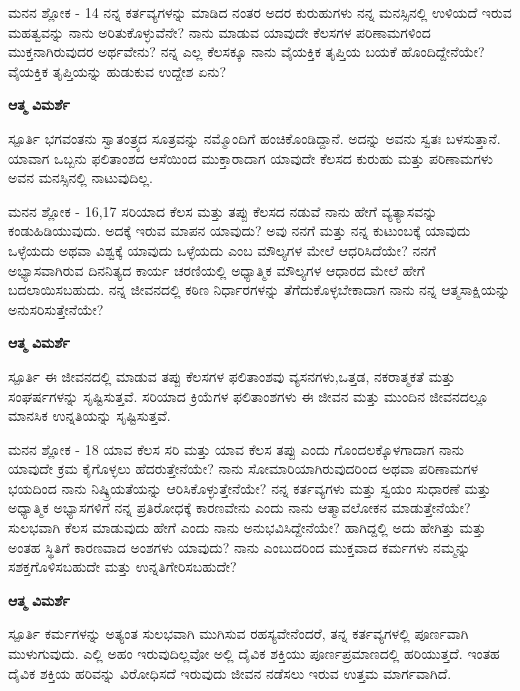 \begin{mananam}{\mananamfont ಮನನ ಶ್ಲೋಕ - \textenglish{14}}
\footnotesize \mananamtext ನನ್ನ ಕರ್ತವ್ಯಗಳನ್ನು ಮಾಡಿದ ನಂತರ ಅದರ ಕುರುಹುಗಳು ನನ್ನ ಮನಸ್ಸಿನಲ್ಲಿ ಉಳಿಯದೆ ಇರುವ ಮಹತ್ವವನ್ನು ನಾನು ಅರಿತುಕೊಳ್ಳುವೆನೇ? ನಾನು ಮಾಡುವ ಯಾವುದೇ ಕೆಲಸಗಳ ಪರಿಣಾಮಗಳಿಂದ ಮುಕ್ತನಾಗಿರುವುದರ ಅರ್ಥವೇನು? ನನ್ನ ಎಲ್ಲ ಕೆಲಸಕ್ಕೂ ನಾನು ವೈಯಕ್ತಿಕ ತೃಪ್ತಿಯ ಬಯಕೆ ಹೊಂದಿದ್ದೇನೆಯೇ? ವೈಯಕ್ತಿಕ ತೃಪ್ತಿಯನ್ನು ಹುಡುಕುವ ಉದ್ದೇಶ ಏನು?
\end{mananam}
\WritingHand\enspace\textbf{ಆತ್ಮ ವಿಮರ್ಶೆ}\\
\begin{inspiration}{\mananamfont ಸ್ಪೂರ್ತಿ}
\footnotesize \mananamtext ಭಗವಂತನು ಸ್ವಾತಂತ್ರ್ಯದ ಸೂತ್ರವನ್ನು ನಮ್ಮೊಂದಿಗೆ ಹಂಚಿಕೊಂಡಿದ್ದಾನೆ. ಅದನ್ನು ಅವನು ಸ್ವತಃ ಬಳಸುತ್ತಾನೆ. ಯಾವಾಗ ಒಬ್ಬನು  ಫಲಿತಾಂಶದ ಆಸೆಯಿಂದ ಮುಕ್ತಾರಾದಾಗ ಯಾವುದೇ ಕೆಲಸದ ಕುರುಹು ಮತ್ತು ಪರಿಣಾಮಗಳು  ಅವನ ಮನಸ್ಸಿನಲ್ಲಿ ನಾಟುವುದಿಲ್ಲ.
\end{inspiration}
\newpage

\begin{mananam}{\mananamfont ಮನನ ಶ್ಲೋಕ - \textenglish{16,17}}
\footnotesize \mananamtext ಸರಿಯಾದ ಕೆಲಸ ಮತ್ತು ತಪ್ಪು ಕೆಲಸದ ನಡುವೆ ನಾನು ಹೇಗೆ ವ್ಯತ್ಯಾಸವನ್ನು ಕಂಡುಹಿಡಿಯುವುದು. ಅದಕ್ಕೆ ಇರುವ ಮಾಪನ ಯಾವುದು? ಅವು ನನಗೆ ಮತ್ತು ನನ್ನ ಕುಟುಂಬಕ್ಕೆ ಯಾವುದು ಒಳ್ಳೆಯದು ಅಥವಾ ವಿಶ್ವಕ್ಕೆ ಯಾವುದು ಒಳ್ಳೆಯದು ಎಂಬ ಮೌಲ್ಯಗಳ ಮೇಲೆ ಆಧರಿಸಿದೆಯೇ? ನನಗೆ ಅಭ್ಯಾಸವಾಗಿರುವ ದಿನನಿತ್ಯದ ಕಾರ್ಯ ಚರಣಿಯಲ್ಲಿ ಅಧ್ಯಾತ್ಮಿಕ ಮೌಲ್ಯಗಳ ಆಧಾರದ ಮೇಲೆ ಹೇಗೆ ಬದಲಾಯಿಸಬಹುದು. ನನ್ನ ಜೀವನದಲ್ಲಿ ಕಠಿಣ ನಿರ್ಧಾರಗಳನ್ನು ತೆಗೆದುಕೊಳ್ಳಬೇಕಾದಾಗ ನಾನು ನನ್ನ ಆತ್ಮಸಾಕ್ಷಿಯನ್ನು ಅನುಸರಿಸುತ್ತೇನೆಯೇ?
\end{mananam}
\WritingHand\enspace\textbf{ಆತ್ಮ ವಿಮರ್ಶೆ}\\
\begin{inspiration}{\mananamfont ಸ್ಪೂರ್ತಿ}
\footnotesize \mananamtext ಈ ಜೀವನದಲ್ಲಿ ಮಾಡುವ ತಪ್ಪು ಕೆಲಸಗಳ ಫಲಿತಾಂಶವು ವ್ಯಸನಗಳು,ಒತ್ತಡ, ನಕರಾತ್ಮಕತೆ ಮತ್ತು ಸಂಘರ್ಷಗಳನ್ನು ಸೃಷ್ಟಿಸುತ್ತವೆ. ಸರಿಯಾದ ಕ್ರಿಯೆಗಳ ಫಲಿತಾಂಶಗಳು ಈ ಜೀವನ ಮತ್ತು ಮುಂದಿನ ಜೀವನದಲ್ಲೂ ಮಾನಸಿಕ ಉನ್ನತಿಯನ್ನು ಸೃಷ್ಟಿಸುತ್ತವೆ.
\end{inspiration}
\newpage

\begin{mananam}{\mananamfont ಮನನ ಶ್ಲೋಕ - \textenglish{18}}
\footnotesize \mananamtext ಯಾವ ಕೆಲಸ ಸರಿ ಮತ್ತು ಯಾವ ಕೆಲಸ ತಪ್ಪು ಎಂದು ಗೊಂದಲಕ್ಕೊಳಗಾದಾಗ ನಾನು ಯಾವುದೇ ಕ್ರಮ ಕೈಗೊಳ್ಳಲು ಹೆದರುತ್ತೇನೆಯೇ? ನಾನು  ಸೋಮಾರಿಯಾಗಿರುವುದರಿಂದ ಅಥವಾ ಪರಿಣಾಮಗಳ ಭಯದಿಂದ ನಾನು ನಿಷ್ಕ್ರಿಯತೆಯನ್ನು ಆರಿಸಿಕೊಳ್ಳುತ್ತೇನೆಯೇ? ನನ್ನ ಕರ್ತವ್ಯಗಳು ಮತ್ತು ಸ್ವಯಂ ಸುಧಾರಣೆ ಮತ್ತು ಅಧ್ಯಾತ್ಮಿಕ ಅಭ್ಯಾಸಗಳಿಗೆ ನನ್ನ ಪ್ರತಿರೋಧಕ್ಕೆ ಕಾರಣವೇನು ಎಂದು ನಾನು ಆತ್ಮಾವಲೋಕನ ಮಾಡುತ್ತೇನೆಯೇ?\\
 ಸುಲಭವಾಗಿ ಕೆಲಸ ಮಾಡುವುದು ಹೇಗೆ ಎಂದು ನಾನು ಅನುಭವಿಸಿದ್ದೇನೆಯೇ? ಹಾಗಿದ್ದಲ್ಲಿ ಅದು ಹೇಗಿತ್ತು ಮತ್ತು ಅಂತಹ ಸ್ಥಿತಿಗೆ ಕಾರಣವಾದ ಅಂಶಗಳು ಯಾವುದು? ನಾನು ಎಂಬುದರಿಂದ ಮುಕ್ತವಾದ ಕರ್ಮಗಳು ನಮ್ಮನ್ನು ಸಶಕ್ತಗೊಳಿಸಬಹುದೇ ಮತ್ತು ಉನ್ನತಿಗೇರಿಸಬಹುದೇ?
\end{mananam}
\WritingHand\enspace\textbf{ಆತ್ಮ ವಿಮರ್ಶೆ}\\
\begin{inspiration}{\mananamfont ಸ್ಪೂರ್ತಿ}
\footnotesize \mananamtext ಕರ್ಮಗಳನ್ನು ಅತ್ಯಂತ ಸುಲಭವಾಗಿ ಮುಗಿಸುವ ರಹಸ್ಯವೇನೆಂದರೆ, ತನ್ನ ಕರ್ತವ್ಯಗಳಲ್ಲಿ ಪೂರ್ಣವಾಗಿ ಮುಳುಗುವುದು. ಎಲ್ಲಿ ಅಹಂ ಇರುವುದಿಲ್ಲವೋ ಅಲ್ಲಿ ದೈವಿಕ ಶಕ್ತಿಯು ಪೂರ್ಣಪ್ರಮಾಣದಲ್ಲಿ ಹರಿಯುತ್ತದೆ. ಇಂತಹ ದೈವಿಕ ಶಕ್ತಿಯ ಹರಿವನ್ನು ವಿರೋಧಿಸದೆ ಇರುವುದು ಜೀವನ ನಡೆಸಲು ಇರುವ ಉತ್ತಮ ಮಾರ್ಗವಾಗಿದೆ.
\end{inspiration}
\newpage

